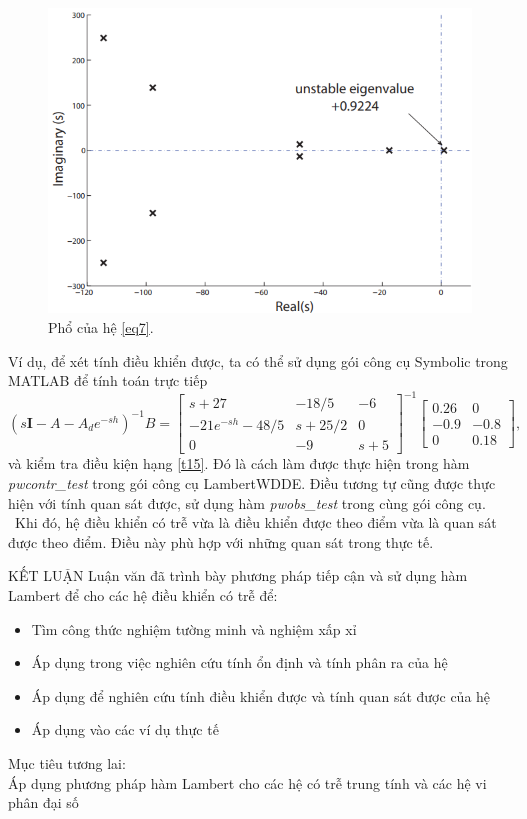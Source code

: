 \documentclass[10pt,notheorems]{beamer}
\theoremstyle{definition}
\theoremstyle{definition}
\theoremstyle{definition}
\newcommand{\m}[1]{
	\begin{bmatrix}
		#1
\end{bmatrix}}
\begin{document}
\begin{frame}
	\begin{figure}[h!]
		\centering
		\includegraphics[width=0.7\linewidth]{hinh/spectrum_diesel}
		\caption{Phổ của hệ \eqref{eq7}.}
		\label{fig:spectrumdiesel}
	\end{figure}
\end{frame}


\begin{frame}
	 Ví dụ, để xét tính điều khiển được, ta có thể sử dụng gói công cụ Symbolic trong MATLAB để tính toán trực tiếp
	\begin{equation*}
	(s\mathbf{I}-A-A_d e^{-sh})^{-1}B 
	= \m{ s + 27 &    -18/5 &    -6 \\ - 21 e^{-sh} - 48/5 & s + 25/2 &     0 \\ 0 & -9 & s + 5 }^{-1} \m{0.26 & 0 \\ -0.9 & -0.8 \\ 0 & 0.18}, 
	\end{equation*}
	và kiểm tra điều kiện hạng \eqref{t15}. Đó là cách làm được thực hiện trong hàm \linebreak \emph{pwcontr\_test} trong gói công cụ LambertWDDE.
	Điều tương tự cũng được thực hiện với tính quan sát được, sử dụng 
	hàm \emph{pwobs\_test} trong cùng gói công cụ. \ 
	Khi đó, hệ điều khiển có trễ vừa là điều khiển được theo điểm vừa là quan sát được theo điểm. Điều này phù hợp với những quan sát trong thực tế.
\end{frame}

\begin{frame}{KẾT LUẬN}
	Luận văn đã trình bày phương pháp tiếp cận và sử dụng hàm Lambert để cho các hệ điều khiển có trễ để:
	\begin{itemize}
		 		 \item Tìm công thức nghiệm tường minh và nghiệm xấp xỉ
		 \item Áp dụng trong việc nghiên cứu tính ổn định và tính phân ra của hệ
		 \item Áp dụng để nghiên cứu tính điều khiển được và tính quan sát được của hệ
		 \item Áp dụng vào các ví dụ thực tế
	\end{itemize}\pause
Mục tiêu tương lai:\\
Áp dụng phương pháp hàm Lambert cho các hệ có trễ trung tính và các hệ vi phân đại số
\end{frame}
\end{document}
